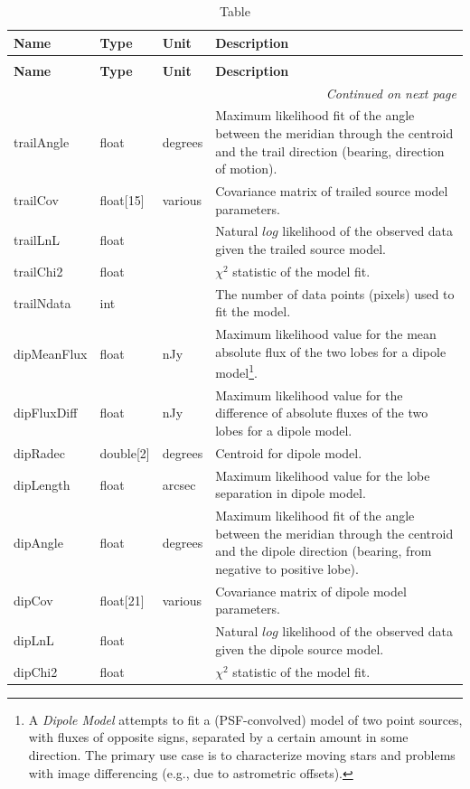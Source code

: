 \documentclass[SE,lsstdraft,toc]{lsstdoc}
\newenvironment{schema}[3]{%
\setlength\LTleft{0pt}
\setlength\LTright{\fill}
\begin{longtable}{p{0.2\textwidth}p{0.14\textwidth}p{0.14\textwidth}p{0.41\textwidth}}

\caption[#1]{#2\label{#3}}\\

\hline \textbf{Name} & \textbf{Type} & \textbf{Unit} & \textbf{Description}\\ \hline
\endfirsthead

\caption[#1]{#2}\\

\hline \textbf{Name} & \textbf{Type} & \textbf{Unit} & \textbf{Description}\\ \hline
\endhead

\hline \multicolumn{4}{r}{\emph{Continued on next page}} \\
\endfoot

\hline\hline
\endlastfoot
}{%
\hline
\end{longtable}
}
\begin{document}
\begin{schema}{\DIASource Table}{\DIASource Table}{tbl:diasourceTable}
trailAngle & float & degrees & Maximum likelihood fit of the angle between the meridian through the centroid and the trail direction (bearing, direction of motion). \\

trailCov & float[15] & various & Covariance matrix of trailed source model parameters. \\

trailLnL & float & ~ & Natural $log$ likelihood of the observed data given the trailed source model. \\

trailChi2 & float & ~ & $\chi^2$ statistic of the model fit. \\

trailNdata & int & ~ & The number of data points (pixels) used to fit the model. \\

dipMeanFlux & float & nJy & Maximum likelihood value for the mean absolute flux of the two lobes for a dipole model\footnote{A \emph{Dipole Model} attempts to fit a (PSF-convolved) model of two point sources, with fluxes
of opposite signs, separated by a certain amount in some direction. The primary use case is to characterize moving stars and problems with image differencing (e.g., due to astrometric offsets).}.
\\

dipFluxDiff & float & nJy & Maximum likelihood value for the difference of absolute fluxes of the two lobes for a dipole model.
\\

dipRadec & double[2] & degrees & Centroid for dipole model. \\

dipLength & float & arcsec & Maximum likelihood value for the lobe separation in dipole model. \\

dipAngle & float & degrees & Maximum likelihood fit of the angle between the meridian through the centroid and the dipole direction (bearing, from negative to positive lobe). \\

dipCov & float[21] & various & Covariance matrix of dipole model parameters. \\

dipLnL & float & ~ & Natural $log$ likelihood of the observed data given the dipole source model. \\

dipChi2 & float & ~ & $\chi^2$ statistic of the model fit. \\


\end{schema}
\end{document}
